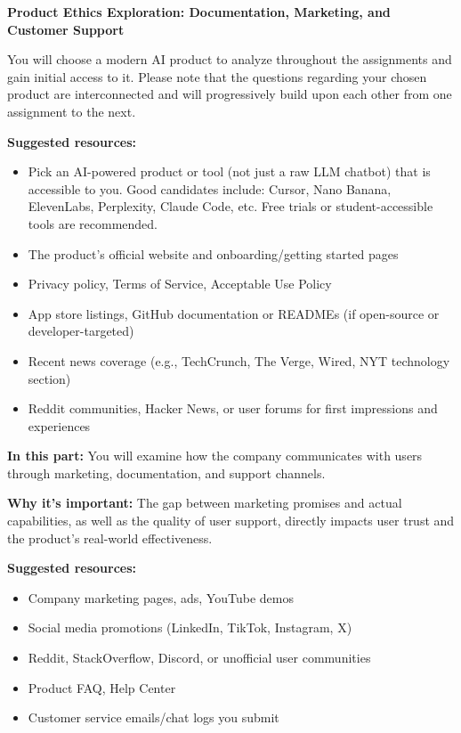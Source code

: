 \item {\bf Product Ethics Exploration: Documentation, Marketing, and Customer Support}

You will choose a modern AI product to analyze throughout the assignments and gain initial access to it. Please note that the questions regarding your chosen product are interconnected and will progressively build upon each other from one assignment to the next.

\textbf{Suggested resources:}
\begin{itemize}
    \item Pick an AI-powered product or tool (not just a raw LLM chatbot) that is accessible to you. Good candidates include: Cursor, Nano Banana, ElevenLabs, Perplexity, Claude Code, etc. Free trials or student-accessible tools are recommended.
    \item The product's official website and onboarding/getting started pages
    \item Privacy policy, Terms of Service, Acceptable Use Policy
    \item App store listings, GitHub documentation or READMEs (if open-source or developer-targeted)
    \item Recent news coverage (e.g., TechCrunch, The Verge, Wired, NYT technology section)
    \item Reddit communities, Hacker News, or user forums for first impressions and experiences
\end{itemize}

\textbf{In this part:} You will examine how the company communicates with users through marketing, documentation, and support channels.

\vspace{2mm}

\textbf{Why it's important:} The gap between marketing promises and actual capabilities, as well as the quality of user support, directly impacts user trust and the product's real-world effectiveness.

\vspace{2mm}

\textbf{Suggested resources:}
\begin{itemize}
  \item Company marketing pages, ads, YouTube demos
  \item Social media promotions (LinkedIn, TikTok, Instagram, X)
  \item Reddit, StackOverflow, Discord, or unofficial user communities
  \item Product FAQ, Help Center
  \item Customer service emails/chat logs you submit
\end{itemize}

\begin{enumerate}
    
    
    
    
\end{enumerate}